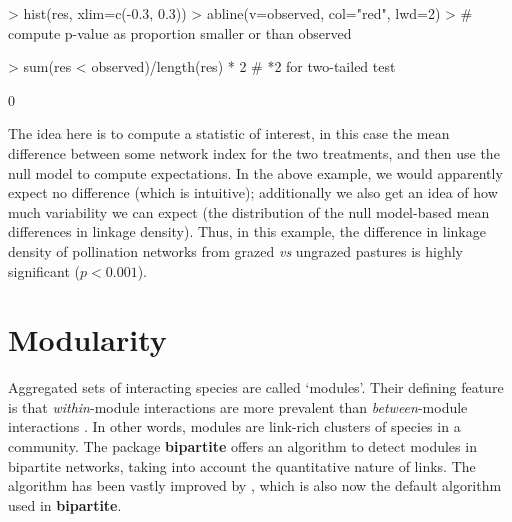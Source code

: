 \documentclass[a4paper, 11pt]{article}
\newcommand{\package}[1]{\textbf{#1}}
\begin{document}
%
\begin{Schunk}
\begin{Sinput}
> hist(res, xlim=c(-0.3, 0.3))
> abline(v=observed, col="red", lwd=2)
> # compute p-value as proportion smaller or than observed
\end{Sinput}
\end{Schunk}
\begin{Schunk}
\begin{Sinput}
> sum(res < observed)/length(res) * 2 # *2 for two-tailed test
\end{Sinput}
\begin{Soutput}
[1] 0
\end{Soutput}
\end{Schunk}
The idea here is to compute a statistic of interest, in this case the mean difference between some network index for the two treatments, and then use the null model to compute expectations. In the above example, we would apparently expect no difference (which is intuitive); additionally we also get an idea of how much variability we can expect (the distribution of the null model-based mean differences in linkage density). Thus, in this example, the difference in linkage density of pollination networks from grazed \emph{vs} ungrazed pastures is highly significant ($p<0.001$).


\section{Modularity}
Aggregated sets of interacting species are called `modules'. Their defining feature is that \emph{within}-module interactions are more prevalent than \emph{between}-module interactions \citep{Newman2003,Newman2004,Fortunato2010}. In other words, modules are link-rich clusters of species in a community. The package \package{bipartite} offers an algorithm \citep[QuaBiMo, described in technical detail here in][]{Dormann2013} to detect modules in bipartite networks, taking into account the quantitative nature of links. The algorithm has been vastly improved by \citep{Beckett2016}, which is also now the default algorithm used in \package{bipartite}.
\end{document}

